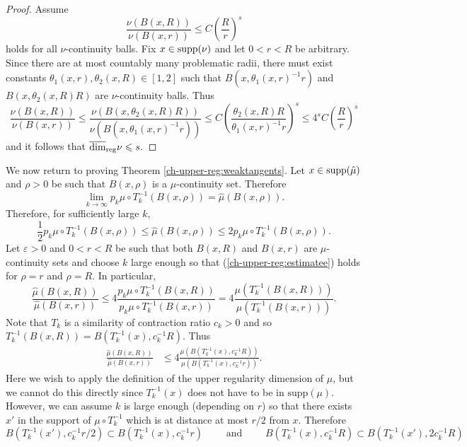 \begin{proof}
	Assume 
	\[
	\frac{\nu(B(x,R))}{\nu(B(x,r))} \leq C\left(\frac{R}{r}\right)^{s}
	\]
	holds for all $\nu$-continuity balls. Fix $x  \in \textup{supp}(\nu)$ and let $0<r<R$ be arbitrary. Since there are at most countably many problematic radii, there must exist constants $\theta_1(x,r),\theta_2(x,R)\in[1,2]$ such that $B(x,\theta_1(x,r)^{-1}r)$ and $B(x,\theta_2(x,R) R)$ are $\nu$-continuity balls. Thus
	\[
	\frac{\nu(B(x,R))}{\nu(B(x,r))} \leq \frac{\nu(B(x,\theta_2(x,R)R))}{\nu(B(x,\theta_1(x,r)^{-1}r))} \le   C\left(\frac{\theta_2(x,R)R}{\theta_1(x,r)^{-1}r}\right)^{s} \le 4^s C \left(\frac{R}{r}\right)^{s}
	\]
	and it follows that $\overline{\dim}_{\textup{reg}}  \nu \le s.$
\end{proof}

We now return to proving Theorem \ref{ch-upper-reg:weaktangents}. Let  $x \in \textup{supp}( \hat \mu)$ and $\rho>0$ be such that $B(x,\rho)$ is a $\hat \mu$-continuity set.   Therefore 
\[
\lim_{k\rightarrow \infty} p_k \mu \circ T^{-1}_k (B(x,\rho)) =\hat{\mu}(B(x,\rho)).
\]
Therefore, for sufficiently large $k$, 
\begin{equation} \label{ch-upper-reg:estimatee}
\frac{1}{2}p_k \mu \circ T^{-1}_k (B(x,\rho))  \le \hat{\mu}(B(x,\rho))\le 2p_k \mu \circ T^{-1}_k (B(x,\rho)).
\end{equation}
Let $\varepsilon > 0 $ and  $0<r<R$ be such that both $B(x,R)$ and $B(x,r)$ are $\hat \mu$-continuity sets  and  choose $k $ large enough so that  (\ref{ch-upper-reg:estimatee}) holds for $\rho=r$ and $\rho=R$.  In particular,  
\[
\frac{\hat{\mu}(B(x,R))}{\hat{\mu}(B(x,r))} \le 4 \frac{p_k\mu \circ T^{-1}_k (B(x,R))}{p_k \mu \circ T^{-1}_k (B(x,r))}=4\frac{\mu (T^{-1}_k (B(x,R)))}{\mu( T^{-1}_k (B(x,r)))}.
\]
Note that $T_k$ is a similarity of contraction ratio $c_k >0$ and so $T_k^{-1}(B(x,R))= B(T_k^{-1}(x),c_k^{-1}R)$. Thus
\begin{align*}
\frac{\hat{\mu}(B(x,R))}{\hat{\mu}(B(x,r))} &\le 4\frac{\mu (B(T_k^{-1}(x),c_k^{-1}R))}{\mu (B(T_k^{-1}(x),c_k^{-1}r))}.
\end{align*}
Here we wish to apply the definition of the upper regularity dimension of $\mu$, but we cannot do this directly since  $T_k^{-1}(x)$ does not have to be in $\text{supp}(\mu)$. However, we can assume $k$ is large enough (depending on $r$) so that there exists $x'$ in the support of $\mu \circ T_k^{-1}$ which is at distance at most $r/2$ from $x$. Therefore
\[
B(T_k^{-1}(x'),c_k^{-1}r/2)\subset B(T_k^{-1}(x),c_k^{-1}r) \qquad \text{ and } \qquad   B(T_k^{-1}(x),c_k^{-1}R) \subset B(T_k^{-1}(x'), 2c_k^{-1}R)
\]
